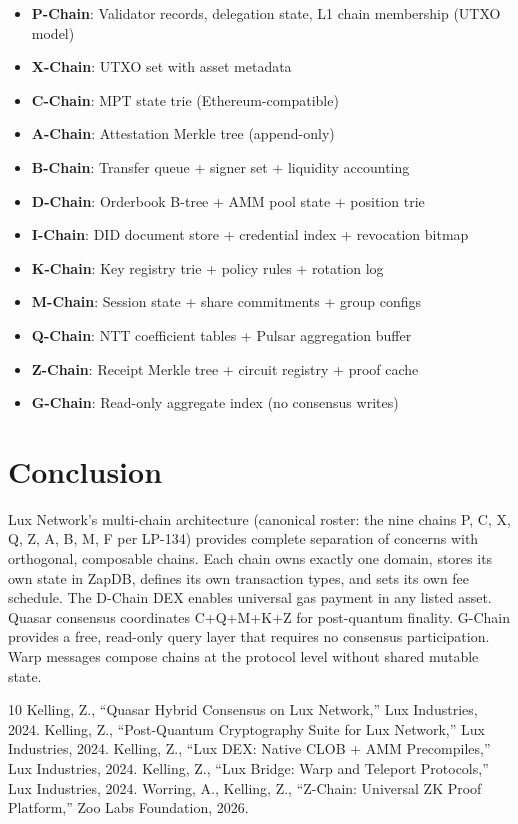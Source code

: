 \documentclass[11pt,a4paper]{article}
\begin{document}
\begin{itemize}
\item \textbf{P-Chain}: Validator records, delegation state, L1 chain membership (UTXO model)
\item \textbf{X-Chain}: UTXO set with asset metadata
\item \textbf{C-Chain}: MPT state trie (Ethereum-compatible)
\item \textbf{A-Chain}: Attestation Merkle tree (append-only)
\item \textbf{B-Chain}: Transfer queue + signer set + liquidity accounting
\item \textbf{D-Chain}: Orderbook B-tree + AMM pool state + position trie
\item \textbf{I-Chain}: DID document store + credential index + revocation bitmap
\item \textbf{K-Chain}: Key registry trie + policy rules + rotation log
\item \textbf{M-Chain}: Session state + share commitments + group configs
\item \textbf{Q-Chain}: NTT coefficient tables + Pulsar aggregation buffer
\item \textbf{Z-Chain}: Receipt Merkle tree + circuit registry + proof cache
\item \textbf{G-Chain}: Read-only aggregate index (no consensus writes)
\end{itemize}

\section{Conclusion}

Lux Network's multi-chain architecture (canonical roster: the nine chains P, C, X, Q, Z, A, B, M, F per LP-134) provides complete separation of concerns with orthogonal, composable chains. Each chain owns exactly one domain, stores its own state in ZapDB, defines its own transaction types, and sets its own fee schedule. The D-Chain DEX enables universal gas payment in any listed asset. Quasar consensus coordinates C+Q+M+K+Z for post-quantum finality. G-Chain provides a free, read-only query layer that requires no consensus participation. Warp messages compose chains at the protocol level without shared mutable state.

\begin{thebibliography}{10}
 Kelling, Z., ``Quasar Hybrid Consensus on Lux Network,'' Lux Industries, 2024.
 Kelling, Z., ``Post-Quantum Cryptography Suite for Lux Network,'' Lux Industries, 2024.
 Kelling, Z., ``Lux DEX: Native CLOB + AMM Precompiles,'' Lux Industries, 2024.
 Kelling, Z., ``Lux Bridge: Warp and Teleport Protocols,'' Lux Industries, 2024.
 Worring, A., Kelling, Z., ``Z-Chain: Universal ZK Proof Platform,'' Zoo Labs Foundation, 2026.
\end{thebibliography}
\end{document}
